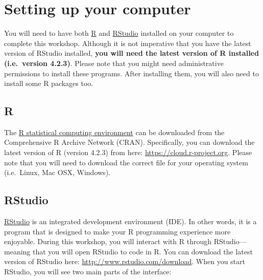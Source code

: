 \documentclass[
  12pt,
]{book}
\begin{document}
\hypertarget{setup}{%
\section{Setting up your computer}\label{setup}}

You will need to have both \href{https://www.r-project.org}{R} and \href{https://www.rstudio.com/}{RStudio} installed on your computer to complete this workshop. Although it is not imperative that you have the latest version of RStudio installed, \textbf{you will need the latest version of R installed (i.e.~version 4.2.3)}. Please note that you might need administrative permissions to install these programs. After installing them, you will also need to install some R packages too.

\hypertarget{r}{%
\subsection{R}\label{r}}

The \href{https://www.r-project.org}{R statistical computing environment} can be downloaded from the Comprehensive R Archive Network (CRAN). Specifically, you can download the latest version of R (version 4.2.3) from here: \url{https://cloud.r-project.org}. Please note that you will need to download the correct file for your operating system (i.e.~Linux, Mac OSX, Windows).

\hypertarget{rstudio}{%
\subsection{RStudio}\label{rstudio}}

\href{https://www.rstudio.com}{RStudio} is an integrated development environment (IDE). In other words, it is a program that is designed to make your R programming experience more enjoyable. During this workshop, you will interact with R through RStudio---meaning that you will open RStudio to code in R. You can download the latest version of RStudio here: \url{http://www.rstudio.com/download}. When you start RStudio, you will see two main parts of the interface:
\end{document}
